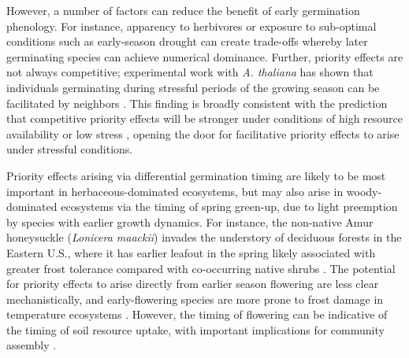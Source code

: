 \documentclass[11pt]{article}
\begin{document}
However, a number of factors can reduce the benefit of early germination phenology. For instance, apparency to herbivores \citep{waterton2016trade} or exposure to sub-optimal conditions such as early-season drought \citep{wainwright2012seasonal} can create trade-offs whereby later germinating species can achieve numerical dominance. Further, priority effects are not always competitive; experimental work with \textit{A. thaliana} has shown that individuals germinating during stressful periods of the growing season can be facilitated by neighbors \citep{leverett2017germination}. This finding is broadly consistent with the prediction that competitive priority effects will be stronger under conditions of high resource availability or low stress \citep{vannette2014historical}, opening the door for facilitative priority effects to arise under stressful conditions.

Priority effects arising via differential germination timing are likely to be most important in herbaceous-dominated ecosystems, but may also arise in woody-dominated ecosystems via the timing of spring green-up, due to light preemption by species with earlier growth dynamics. For instance, the non-native Amur honeysuckle (\textit{Lonicera maackii}) invades the understory of deciduous forests in the Eastern U.S., where it has earlier leafout in the spring likely associated with greater frost tolerance compared with co-occurring native shrubs \citep{mcewan2009leaf}. The potential for priority effects to arise directly from earlier season flowering are less clear mechanistically, and early-flowering species are more prone to frost damage in temperature ecosystems \citep{inouye2008effects}. However, the timing of flowering can be indicative of the timing of soil resource uptake, with important implications for community assembly \citep{gulmon1983phenology,seabloom2003invasion}.
\end{document}
